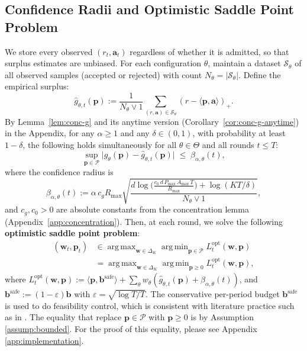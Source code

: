 \documentclass[11pt]{article}
\newcommand{\bb}{\mathbf{b}}
\newcommand{\bbS}{\mathbf{b}^{\mathrm{safe}}}
\newcommand{\ba}{\mathbf{a}}
\newcommand{\bp}{\mathbf{p}}
\newcommand{\bw}{\mathbf{w}}
\newcommand{\cP}{\mathcal{P}}
\newcommand{\cS}{\mathcal{S}}
\DeclareMathOperator*{\argmax}{arg\,max}
\DeclareMathOperator*{\argmin}{arg\,min}
\begin{document}
\subsection{Confidence Radii and Optimistic Saddle Point Problem}
We store every observed $(r_t,\ba_t)$ regardless of whether it is admitted, so that surplus estimates are unbiased.
For each configuration $\theta$, maintain a dataset $\cS_\theta$ of all observed samples (accepted or rejected) with count $N_\theta = |\cS_\theta|$. Define the empirical surplus:
\[
\widehat{g}_{\theta,t}(\bp) := \frac{1}{N_\theta \vee 1} \sum_{(r, \ba) \in \cS_\theta} (r - \langle \bp, \ba \rangle)_+.
\]
By Lemma~\ref{lem:conc-g} and its anytime version (Corollary~\ref{cor:conc-g-anytime}) in the Appendix,
for any $\alpha\geq 1$ and any $\delta\in(0,1)$, with probability at least $1-\delta$,
the following holds simultaneously for all $\theta\in\Theta$ and all rounds $t\le T$:
\[
\sup_{\bp\in\cP}\big|g_\theta(\bp)-\widehat g_{\theta,t}(\bp)\big|\;\le\;\beta_{\alpha,\theta}(t),
\]
where the confidence radius is
\[
\beta_{\alpha,\theta}(t)
:=\alpha\, c_g R_{\max} \sqrt{\frac{d \log\!\Big(\frac{c_0\,d\,P_{\max}\,A_{\max}\,T}{R_{\max}}\Big) + \log(KT/\delta)}{N_\theta \vee 1}},
\]
and $c_g, c_0 > 0$ are absolute constants from the concentration lemma (Appendix~\ref{app:concentration}).
Then, at each round, we solve the following \textbf{optimistic saddle point problem}:
\begin{equation}
\label{eq:optimistic-saddle}
\begin{aligned}
    (\bw_t, \bp_t) &\in \argmax_{\bw \in \Delta_K} \argmin_{\bp \in \cP} L_t^{\mathrm{opt}}(\bw, \bp)\\
    &=\argmax_{\bw \in \Delta_K} \argmin_{\bp \geq 0} L_t^{\mathrm{opt}}(\bw, \bp),
\end{aligned}
\end{equation}
where $L_t^{\mathrm{opt}}(\bw, \bp) := \langle \bp, \bbS \rangle + \sum_\theta w_\theta (\widehat{g}_{\theta,t}(\bp) + \beta_{\alpha,\theta}(t))$, and $\bbS:=(1-\varepsilon)\bb$ with
$\varepsilon=\sqrt{\log T/T}$. The conservative per-period budget $\bbS$ is used to do feasibility control, which is consistent with literature practice such as in \cite{Agrawal2014}. The equality that replace $\bp\in\cP$ with $\bp\geq 0$ is by Assumption \ref{assump:bounded}. For the proof of this equality, please see Appendix \ref{app:implementation}.
\end{document}
